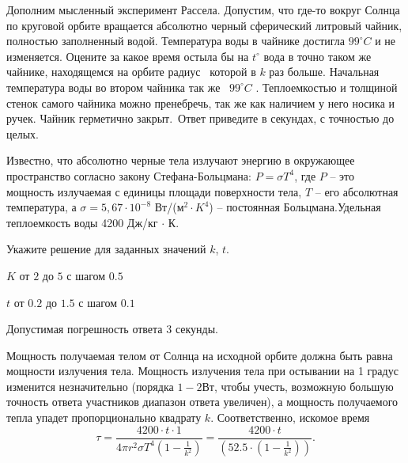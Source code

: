 
Дополним мысленный эксперимент Рассела. Допустим, что где-то вокруг Солнца по круговой орбите вращается абсолютно черный сферический литровый чайник, полностью заполненный водой. Температура воды в чайнике достигла $99^{\circ}C$ и не изменяется. Оцените за какое время остыла бы на $t^{\circ}$ вода в точно таком же чайнике, находящемся на орбите радиус  которой в $k$ раз больше. Начальная температура воды во втором чайника так же 
$99^{\circ}C$ . Теплоемкостью и толщиной стенок самого чайника можно пренебречь, так же как наличием у него носика и ручек. Чайник герметично закрыт. Ответ приведите в секундах, с точностью до целых.

Известно, что абсолютно черные тела излучают энергию в окружающее пространство согласно закону Стефана-Больцмана:  $P=\sigma T^4$, где $P$ – это мощность излучаемая с единицы площади поверхности тела, $T$ – его абсолютная температура, а $\sigma=5,67 \cdot 10^{-8}$ Вт/(м$^2 \cdot K^4$) – постоянная Больцмана.Удельная теплоемкость воды 4200 Дж/кг $\cdot$ К.

Укажите решение для заданных значений $k$, $t$.

\paramSection

$K$ от $2$ до $5$ с шагом $0.5$

$t$ от $0.2$ до $1.5$ с шагом $0.1$

Допустимая погрешность ответа 3 секунды.

\solutionSection

Мощность получаемая телом от Солнца на исходной орбите должна быть равна мощности излучения тела. 
Мощность излучения тела при остывании на 1 градус изменится незначительно 
(порядка $1-2$Вт, чтобы учесть, возможную большую точность ответа участников диапазон ответа увеличен), 
а мощность получаемого тепла упадет пропорционально квадрату $k$. 
Соответственно, искомое время $$ \tau=\frac{4200 \cdot t \cdot 1}{4\pi r^2 \sigma T^4 (1-\frac{1}{k^2} )}=\frac{4200 \cdot t}{(52.5 \cdot (1-\frac{1}{k^2}))}.$$

